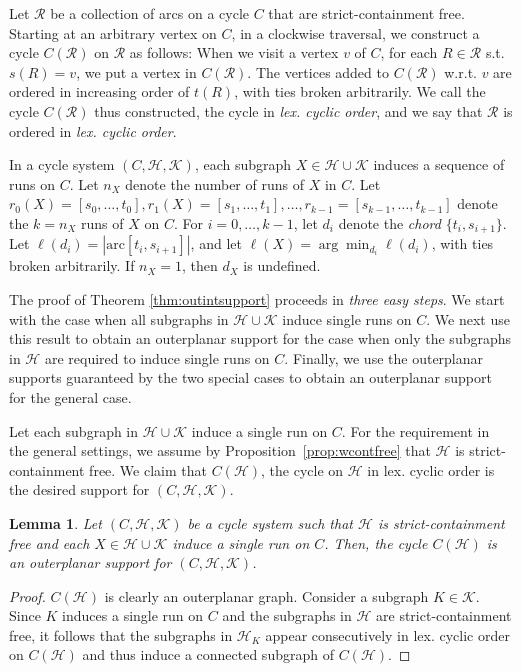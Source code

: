 \documentclass[12pt]{article}
\newcommand{\HH}{\mathcal{H}}
\newcommand{\arc}{\mathrm{arc}}
\newtheorem{lemma}[theorem]{Lemma}
\theoremstyle{case}
\begin{document}
Let $\mathcal{R}$ be a collection of arcs on a cycle $C$ that are strict-containment free. 
Starting at an arbitrary vertex on $C$, in a clockwise traversal, we construct a cycle $C(\mathcal{R})$ on
$\mathcal{R}$ as follows: 
When we visit a vertex $v$ of $C$, for each $R\in\mathcal{R}$ 
s.t. $s(R)=v$,
we put a vertex in $C(\mathcal{R})$. The vertices added to $C(\mathcal{R})$ w.r.t. $v$
are ordered in increasing order of $t(R)$, with ties broken
arbitrarily.
We call the cycle $C(\mathcal{R})$ thus constructed, the
cycle in \emph{lex. cyclic order}, and we say that $\mathcal{R}$
is ordered in \emph{lex. cyclic order}.

In a cycle system $(C,\mathcal{H},\mathcal{K})$, each subgraph $X\in\mathcal{H}\cup\mathcal{K}$ induces
a sequence of runs on $C$. Let $n_X$ denote the number of runs of $X$ in $C$.
Let $r_0(X)=[s_0,\ldots, t_0], r_1(X)=[s_1,\ldots, t_1], \ldots, r_{k-1}=[s_{k-1},\ldots, t_{k-1}]$ denote the
$k=n_X$ runs of $X$ on $C$. 
For $i=0,\ldots, k-1$, let $d_i$ denote the \emph{chord} $\{t_i, s_{i+1}\}$. 
Let $\ell(d_i)=|\arc[t_i, s_{i+1}]|$, and let 
$\ell(X) = \arg\min_{d_i} \ell(d_i)$, with ties broken arbitrarily. If $n_X=1$, then $d_X$ is undefined.

The proof of Theorem \ref{thm:outintsupport} proceeds in \emph{three easy steps}.
We start with the case when all subgraphs in $\mathcal{H}\cup \mathcal{K}$ induce single runs on $C$. 
We next use this result to 
obtain an outerplanar support for the case when only the
subgraphs in $\mathcal{H}$ are required to induce single runs on $C$.
Finally, we use the outerplanar supports guaranteed by the two special
cases to obtain an outerplanar support for the general case.

Let each subgraph in $\mathcal{H}\cup\mathcal{K}$ induce a single run
on $C$. For the requirement in the general settings, we assume by Proposition~\ref{prop:wcontfree} that $\mathcal{H}$ is strict-containment free. We claim that $C(\mathcal{H})$, the cycle on
$\mathcal{H}$ in lex. cyclic order is the desired support for $(C,\mathcal{H},\mathcal{K})$.

\begin{lemma}\label{lem:cyclesupport}
Let $(C,\mathcal{H,K})$ be a cycle system such that $\mathcal{H}$ is strict-containment free and each $X\in\mathcal{H\cup K}$ induce a single run on $C$.
Then, the cycle $C(\mathcal{H})$ is an outerplanar support for $(C,\mathcal{H,K})$.
\end{lemma}

\begin{proof}
$C(\mathcal{H})$ is clearly an outerplanar graph. Consider a subgraph $K\in\mathcal{K}$. Since $K$ induces a single run on $C$ 
and the subgraphs in $\mathcal{H}$ are strict-containment free, 
it follows that the subgraphs in $\mathcal{H}_K$ appear consecutively in lex. cyclic order on $C(\mathcal{H})$ and thus induce a connected subgraph of $C(\HH)$.
\end{proof}
\end{document}
